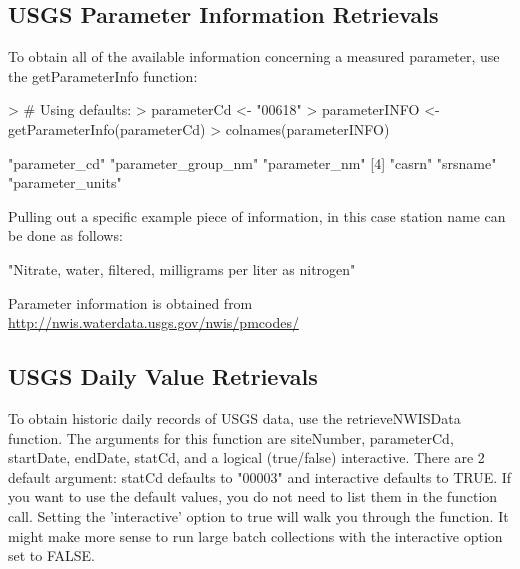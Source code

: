 \documentclass[a4paper,11pt]{article}
\begin{document}
\subsection{USGS Parameter Information Retrievals}
\label{sec:usgsParams}
To obtain all of the available information concerning a measured parameter, use the getParameterInfo function:
\begin{Schunk}
\begin{Sinput}
> # Using defaults:
> parameterCd <- "00618" 
> parameterINFO <- getParameterInfo(parameterCd)
> colnames(parameterINFO)
\end{Sinput}
\begin{Soutput}
[1] "parameter_cd"       "parameter_group_nm" "parameter_nm"      
[4] "casrn"              "srsname"            "parameter_units"   
\end{Soutput}
\end{Schunk}

Pulling out a specific example piece of information, in this case station name can be done as follows:
\begin{Schunk}
\begin{Soutput}
[1] "Nitrate, water, filtered, milligrams per liter as nitrogen"
\end{Soutput}
\end{Schunk}
Parameter information is obtained from \url{http://nwis.waterdata.usgs.gov/nwis/pmcodes/}

\subsection{USGS Daily Value Retrievals}
\label{sec:usgsDaily}
To obtain historic daily records of USGS data, use the retrieveNWISData function. The arguments for this function are siteNumber, parameterCd, startDate, endDate, statCd, and a logical (true/false) interactive. There are 2 default argument: statCd defaults to "00003" and interactive defaults to TRUE.  If you want to use the default values, you do not need to list them in the function call. Setting the 'interactive' option to true will walk you through the function. It might make more sense to run large batch collections with the interactive option set to FALSE. 
\end{document}
